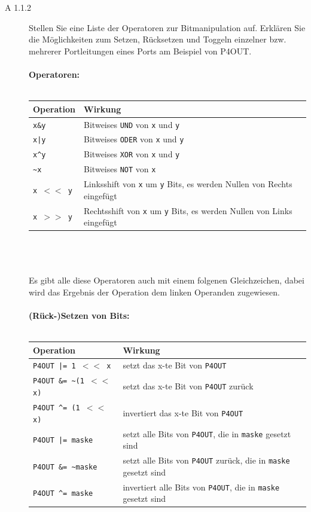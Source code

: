 \documentclass[11pt,a4paper,ngerman]{article}
\begin{document}
\begin{description}
	\item[A 1.1.2] Stellen Sie eine Liste der Operatoren zur Bitmanipulation auf. Erklären Sie die Möglichkeiten zum Setzen, Rücksetzen und Toggeln einzelner bzw. mehrerer Portleitungen eines Ports am Beispiel von P4OUT.  \\ \\
		\textbf{Operatoren:} \\ \\
		\begin{tabular}{l|l}
		Operation & Wirkung \\
		\hline \hline
		\texttt{x\&y} & Bitweises \texttt{UND} von \texttt{x} und \texttt{y} \\
		\texttt{x|y} & Bitweises \texttt{ODER} von \texttt{x} und \texttt{y} \\
		\texttt{x\textasciicircum y} & Bitweises \texttt{XOR} von \texttt{x} und \texttt{y} \\
		\texttt{\textasciitilde x} & Bitweises  \texttt{NOT} von \texttt{x} \\
		\texttt{x $<<$ y} & Linksshift von \texttt{x} um \texttt{y} Bits, es werden Nullen von Rechts eingefügt \\
		\texttt{x $>>$ y} & Rechtsshift von \texttt{x} um \texttt{y} Bits, es werden Nullen von Links eingefügt \\
		\end{tabular}
		\\ \\ \\
		Es gibt alle diese Operatoren auch mit einem folgenen Gleichzeichen, dabei wird das Ergebnis der Operation dem linken Operanden zugewiesen.\\ \\
		\textbf{(Rück-)Setzen von Bits:} \\ \\
		\begin{tabular}{l|l}
		Operation & Wirkung \\
		\hline \hline
		\texttt{P4OUT |= 1 $<<$ x}	 & setzt das x-te Bit von \texttt{P4OUT} \\
		\texttt{P4OUT \&= \textasciitilde(1 $<<$ x)} & setzt das x-te Bit von \texttt{P4OUT} zurück \\
		\texttt{P4OUT \textasciicircum= (1 $<<$ x)} & invertiert das x-te Bit von \texttt{P4OUT} \\
		\texttt{P4OUT |= maske} & setzt alle Bits von \texttt{P4OUT}, die in \texttt{maske} gesetzt sind\\
		\texttt{P4OUT \&= \textasciitilde maske} & setzt alle Bits von \texttt{P4OUT} zurück, die in \texttt{maske} gesetzt sind \\	
		\texttt{P4OUT \textasciicircum = maske} & invertiert alle Bits von \texttt{P4OUT}, die in \texttt{maske} gesetzt sind \\
		\end{tabular}
		

\end{description}
\end{document}
